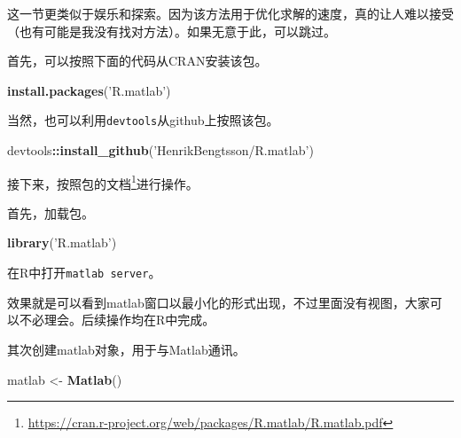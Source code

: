 \documentclass[]{ctexbook}
\newenvironment{Shaded}{\begin{snugshade}}{\end{snugshade}}
\newcommand{\KeywordTok}[1]{\textcolor[rgb]{0.13,0.29,0.53}{\textbf{#1}}}
\newcommand{\StringTok}[1]{\textcolor[rgb]{0.31,0.60,0.02}{#1}}
\newcommand{\OperatorTok}[1]{\textcolor[rgb]{0.81,0.36,0.00}{\textbf{#1}}}
\newcommand{\NormalTok}[1]{#1}
\renewcommand{\href}[2]{#2\footnote{\url{#1}}}
\theoremstyle{definition}
\theoremstyle{definition}
\theoremstyle{definition}
\theoremstyle{remark}
\begin{document}
这一节更类似于娱乐和探索。因为该方法用于优化求解的速度，真的让人难以接受（也有可能是我没有找对方法）。如果无意于此，可以跳过。

首先，可以按照下面的代码从CRAN安装该包。

\begin{Shaded}
\begin{Highlighting}[]
\KeywordTok{install.packages}\NormalTok{(}\StringTok{'R.matlab'}\NormalTok{)}
\end{Highlighting}
\end{Shaded}

当然，也可以利用\texttt{devtools}从github上按照该包。

\begin{Shaded}
\begin{Highlighting}[]
\NormalTok{devtools}\OperatorTok{::}\KeywordTok{install_github}\NormalTok{(}\StringTok{'HenrikBengtsson/R.matlab'}\NormalTok{)}
\end{Highlighting}
\end{Shaded}

接下来，按照\href{https://cran.r-project.org/web/packages/R.matlab/R.matlab.pdf}{包的文档}进行操作。

首先，加载包。

\begin{Shaded}
\begin{Highlighting}[]
\KeywordTok{library}\NormalTok{(}\StringTok{'R.matlab'}\NormalTok{)}
\end{Highlighting}
\end{Shaded}

在R中打开\texttt{matlab\ server}。

\begin{Shaded}
\end{Shaded}

效果就是可以看到matlab窗口以最小化的形式出现，不过里面没有视图，大家可以不必理会。后续操作均在R中完成。

其次创建matlab对象，用于与Matlab通讯。

\begin{Shaded}
\begin{Highlighting}[]
\NormalTok{matlab <-}\StringTok{ }\KeywordTok{Matlab}\NormalTok{()}
\end{Highlighting}
\end{Shaded}
\end{document}
